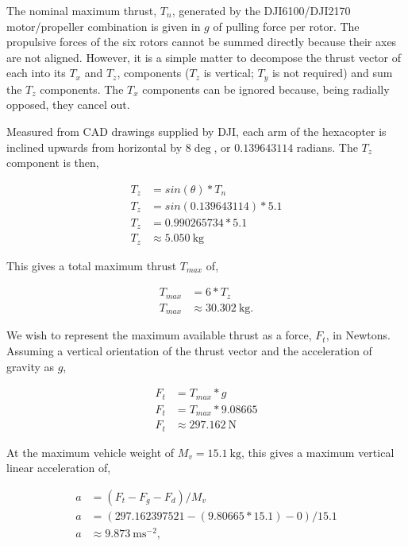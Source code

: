 The nominal maximum thrust, $T_n$, generated by the DJI6100/DJI2170 motor/propeller combination is given in $g$ of pulling force per rotor. The propulsive forces of the six rotors cannot be summed directly because their axes are not aligned. However, it is a simple matter to decompose the thrust vector of each into its $T_x$ and $T_z$, components ($T_z$ is vertical; $T_y$ is not required) and sum the $T_z$ components. The $T_x$ components can be ignored because, being radially opposed, they cancel out.

Measured from CAD drawings supplied by DJI, each arm of the hexacopter is inclined upwards from horizontal by $8\deg$, or $0.139643114$ radians. The $T_z$ component is then,

\begin{equation}
\begin{split}
T_z &= sin(\theta) * T_n \\
T_z &= sin(0.139643114) * 5.1 \\
T_z &= 0.990265734 * 5.1 \\
T_z &\approx \SI{5.050}{\kg} %
\end{split}
\end{equation}

This gives a total maximum thrust $T_{max}$ of,

\begin{equation}
\begin{split}
T_{max} &= 6 * T_z \\
T_{max} &\approx \SI{30.302}{\kg}.
\end{split}
\end{equation} 

We wish to represent the maximum available thrust as a force, $F_t$, in Newtons. Assuming a vertical orientation of the thrust vector and the acceleration of gravity as $g$, 

\begin{equation}
\begin{split}
F_t &= T_{max} * g \\
F_t &= T_{max} * 9.08665 \\
F_t &\approx \SI{297.162}{\N}
\end{split}
\end{equation}

At the maximum vehicle weight of $M_v = \SI{15.1}{\kg}$, this gives a maximum vertical linear acceleration of,

\begin{equation}
\begin{split}
a &= (F_t - F_g - F_d) / M_v \\
a &= (297.162397521 - (9.80665 * 15.1) - 0) / 15.1 \\
a &\approx \SI{9.873}{\m\s^{-2}}, %
\end{split}
\end{equation}

